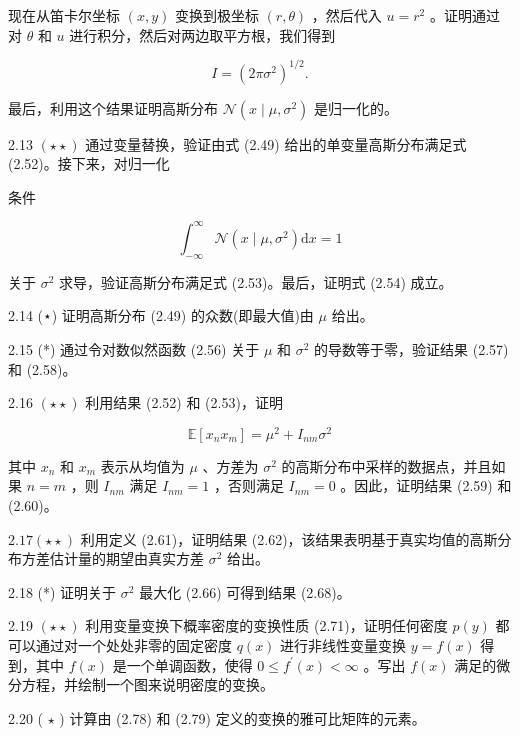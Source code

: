 \documentclass[10pt]{article}
\begin{document}
现在从笛卡尔坐标 \(\left( {x,y}\right)\) 变换到极坐标 \(\left( {r,\theta }\right)\) ，然后代入 \(u = {r}^{2}\) 。证明通过对 \(\theta\) 和 \(u\) 进行积分，然后对两边取平方根，我们得到

\[
I = {\left( 2\pi {\sigma }^{2}\right) }^{1/2}. \tag{2.126}
\]

最后，利用这个结果证明高斯分布 \(\mathcal{N}\left( {x \mid  \mu ,{\sigma }^{2}}\right)\) 是归一化的。

2.13 \(\left( {\star  \star  }\right)\) 通过变量替换，验证由式 (2.49) 给出的单变量高斯分布满足式 (2.52)。接下来，对归一化

条件

\[
{\int }_{-\infty }^{\infty }\mathcal{N}\left( {x \mid  \mu ,{\sigma }^{2}}\right) \mathrm{d}x = 1 \tag{2.127}
\]

关于 \({\sigma }^{2}\) 求导，验证高斯分布满足式 (2.53)。最后，证明式 (2.54) 成立。

2.14 (⋆) 证明高斯分布 (2.49) 的众数(即最大值)由 \(\mu\) 给出。

2.15 (*) 通过令对数似然函数 (2.56) 关于 \(\mu\) 和 \({\sigma }^{2}\) 的导数等于零，验证结果 (2.57) 和 (2.58)。

2.16 \(\left( {\star  \star  }\right)\) 利用结果 (2.52) 和 (2.53)，证明

\[
\mathbb{E}\left\lbrack  {{x}_{n}{x}_{m}}\right\rbrack   = {\mu }^{2} + {I}_{nm}{\sigma }^{2} \tag{2.128}
\]

其中 \({x}_{n}\) 和 \({x}_{m}\) 表示从均值为 \(\mu\) 、方差为 \({\sigma }^{2}\) 的高斯分布中采样的数据点，并且如果 \(n = m\) ，则 \({I}_{nm}\) 满足 \({I}_{nm} = 1\) ，否则满足 \({I}_{nm} = 0\) 。因此，证明结果 (2.59) 和 (2.60)。

\({2.17}\left( {\star  \star  }\right)\) 利用定义 (2.61)，证明结果 (2.62)，该结果表明基于真实均值的高斯分布方差估计量的期望由真实方差 \({\sigma }^{2}\) 给出。

2.18 (*) 证明关于 \({\sigma }^{2}\) 最大化 (2.66) 可得到结果 (2.68)。

2.19 \(\left( {\star  \star  }\right)\) 利用变量变换下概率密度的变换性质 (2.71)，证明任何密度 \(p\left( y\right)\) 都可以通过对一个处处非零的固定密度 \(q\left( x\right)\) 进行非线性变量变换 \(y = f\left( x\right)\) 得到，其中 \(f\left( x\right)\) 是一个单调函数，使得 \(0 \leq  {f}^{\prime }\left( x\right)  < \infty\) 。写出 \(f\left( x\right)\) 满足的微分方程，并绘制一个图来说明密度的变换。

2.20 ( \(\star\) ) 计算由 (2.78) 和 (2.79) 定义的变换的雅可比矩阵的元素。
\end{document}
